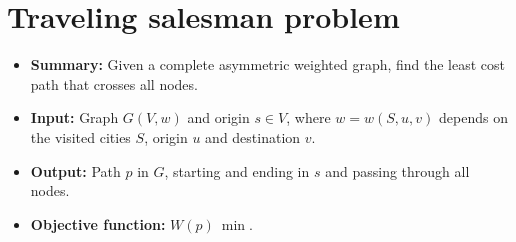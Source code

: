 \section{Traveling salesman problem} \label{algorithm-tsp}
\begin{itemize}
    \item \textbf{Summary:} Given a complete asymmetric weighted graph, find the least cost path that crosses all nodes. 
    \item \textbf{Input:} Graph $G(V,w)$ and origin $s \in V$, where $w=w(S, u, v)$ depends on the visited cities $S$, origin $u$ and destination $v$.
    \item \textbf{Output:} Path $p$ in $G$, starting and ending in $s$ and passing through all nodes.
    \item \textbf{Objective function:} $W(p)~\min$.
\end{itemize}


